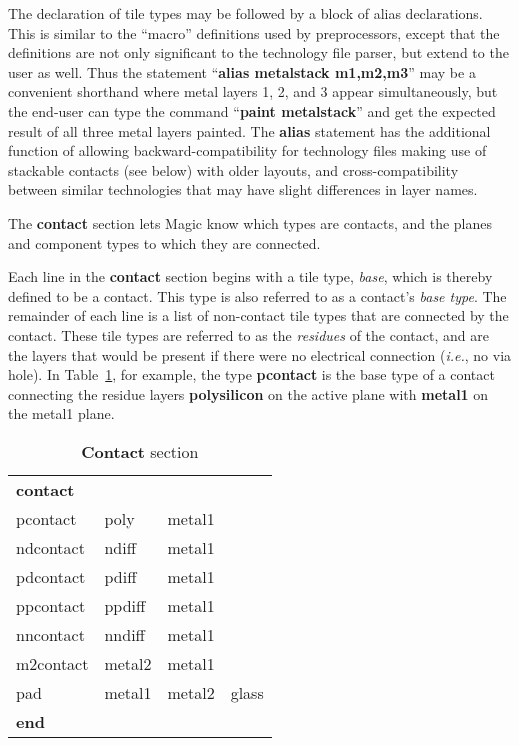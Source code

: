 \documentclass[letterpaper,twoside,12pt]{article}
\begin{document}
The declaration of tile types may be followed by a block of alias
declarations.  This is similar to the ``macro'' definitions used
by preprocessors, except that the definitions are not only significant
to the technology file parser, but extend to the user as well.  Thus
the statement ``{\bfseries alias metalstack m1,m2,m3}'' may be a convenient 
shorthand where metal layers 1, 2, and 3 appear simultaneously, but
the end-user can type the command ``{\bfseries paint metalstack}'' and
get the expected result of all three metal layers painted.  The
{\bfseries alias} statement has the additional function of allowing
backward-compatibility for technology files making use of stackable
contacts (see below) with older layouts, and cross-compatibility
between similar technologies that may have slight differences in layer
names.

The {\bfseries contact} section lets Magic know which types are contacts,
and the planes and component types to which they are connected.

Each line in the {\bfseries contact}
section begins with a tile type, {\itshape base}, which is thereby
defined to be a contact.
This type is also referred to as a contact's {\itshape base type}.
The remainder of each line is a list of non-contact tile types
that are connected by the contact.
These tile types are referred to as the {\itshape residues}
of the contact, and are the layers that would be present if there
were no electrical connection ({\itshape i.e.}, no via hole).
In Table~\ref{contacts}, for example, the type
{\bfseries pcontact} is the base type of a contact connecting
the residue layers {\bfseries polysilicon} on the active plane
with {\bfseries metal1} on the metal1 plane.

\begin{table}[ht]
   \begin{center}
      \begin{tabular}{|llll|} \hline
	{\bfseries contact} &&& \\
	pcontact	& poly	 & metal1 & \\
	ndcontact	& ndiff	 & metal1 & \\
	pdcontact	& pdiff	 & metal1 & \\
	ppcontact	& ppdiff & metal1 & \\
	nncontact	& nndiff & metal1 & \\
	m2contact	& metal2 & metal1 & \\
	pad		& metal1 & metal2 & glass \\
	{\bfseries end} &&& \\ \hline
      \end{tabular}
      \caption{{\bfseries Contact} section}
      \label{contacts}
   \end{center}
\end{table}
\end{document}
